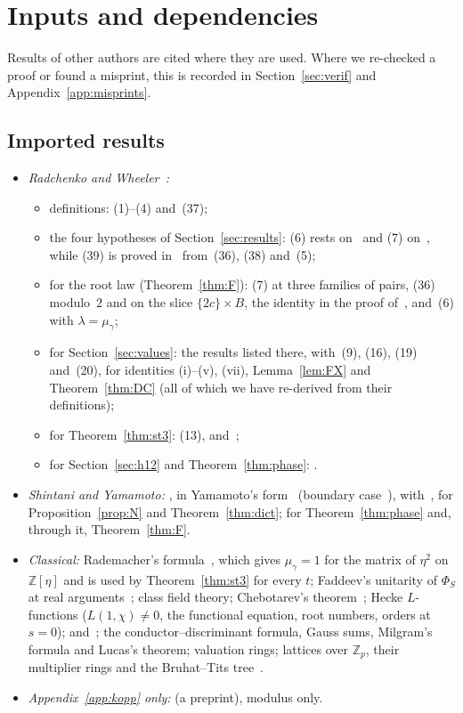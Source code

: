 \documentclass[11pt]{amsart}
\numberwithin{equation}{section}
\theoremstyle{plain}
\theoremstyle{definition}
\theoremstyle{remark}
\begin{document}
\section{Inputs and dependencies}\label{sec:inputs}

Results of other authors are cited where they are used. Where we re-checked a proof or found a misprint, this is recorded in Section~\ref{sec:verif} and Appendix~\ref{app:misprints}.

\subsection*{Imported results}
\begin{itemize}
\item \emph{Radchenko and Wheeler~\cite{RW}:}
\begin{itemize}
\item definitions: (1)--(4) and~(37);
\item the four hypotheses of Section~\ref{sec:results}: (6) rests on~\cite[Thm.~3, (22)]{RW} and (7) on~\cite[Thm.~3, (23)]{RW}, while (39) is proved in~\cite{RW} from~(36), (38) and~(5);
\item for the root law (Theorem~\ref{thm:F}): (7) at three families of pairs, (36) modulo~$2$ and on the slice $\{2c\}\times B$, the identity in the proof of~\cite[Thm.~10]{RW}, and~(6) with $\lambda=\mu_\gamma$;
\item for Section~\ref{sec:values}: the results listed there, with~(9), (16), (19) and~(20), for identities (i)--(v), (vii), Lemma~\ref{lem:FX} and Theorem~\ref{thm:DC} (all of which we have re-derived from their definitions);
\item for Theorem~\ref{thm:st3}: (13), \cite[Lemma~2]{RW} and~\cite[Prop.~1]{RW};
\item for Section~\ref{sec:h12} and Theorem~\ref{thm:phase}: \cite[Props.~3, 4, 5]{RW}.
\end{itemize}
\item \emph{Shintani and Yamamoto:} \cite[Props.~3, 5]{Sh}, in Yamamoto's form~\cite[Thm.~5.1.1]{Ya08} (boundary case~\cite[Thms.~3.5, 4.10]{Ya10}), with~\cite[Thm.~5.2.3, Cor.~5.2.5(1)]{Ya08}, for Proposition~\ref{prop:N} and Theorem~\ref{thm:dict}; \cite{Sh76} for Theorem~\ref{thm:phase} and, through it, Theorem~\ref{thm:F}.
\item \emph{Classical:} Rademacher's formula~\cite{RG}, which gives $\mu_\gamma=1$ for the matrix of $\eta^2$ on $\mathbb Z[\eta]$ and is used by Theorem~\ref{thm:st3} for every $t$; Faddeev's unitarity of $\Phi_S$ at real arguments~\cite{Fa95}; class field theory; Chebotarev's theorem~\cite{Ch}; Hecke $L$-functions ($L(1,\chi)\ne0$, the functional equation, root numbers, orders at $s=0$); \cite[Ch.~IV]{Ta} and~\cite{Ru}; the conductor--discriminant formula, Gauss sums, Milgram's formula and Lucas's theorem; valuation rings; lattices over $\mathbb Z_p$, their multiplier rings and the Bruhat--Tits tree~\cite{Se}.
\item \emph{Appendix~\ref{app:kopp} only:} \cite[Thm.~1.1]{Ko} (a preprint), modulus only.
\end{itemize}
\end{document}
